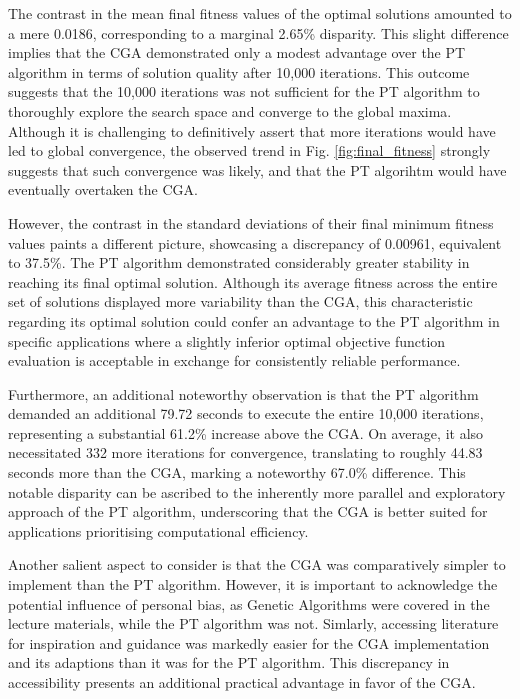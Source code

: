 \documentclass[10pt]{article}
\begin{document}
\begin{multicols}{2}
The contrast in the mean final fitness values of the optimal solutions amounted to a mere 0.0186, corresponding to a marginal 2.65\% disparity. This slight difference implies that the CGA demonstrated only a modest advantage over the PT algorithm in terms of solution quality after 10,000 iterations. This outcome suggests that the 10,000 iterations was not sufficient for the PT algorithm to thoroughly explore the search space and converge to the global maxima. Although it is challenging to definitively assert that more iterations would have led to global convergence, the observed trend in Fig. \ref{fig:final_fitness} strongly suggests that such convergence was likely, and that the PT algorihtm would have eventually overtaken the CGA.

However, the contrast in the standard deviations of their final minimum fitness values paints a different picture, showcasing a discrepancy of 0.00961, equivalent to 37.5\%. The PT algorithm demonstrated considerably greater stability in reaching its final optimal solution. Although its average fitness across the entire set of solutions displayed more variability than the CGA, this characteristic regarding its optimal solution could confer an advantage to the PT algorithm in specific applications where a slightly inferior optimal objective function evaluation is acceptable in exchange for consistently reliable performance.

Furthermore, an additional noteworthy observation is that the PT algorithm demanded an additional 79.72 seconds to execute the entire 10,000 iterations, representing a substantial 61.2\% increase above the CGA. On average, it also necessitated 332 more iterations for convergence, translating to roughly 44.83 seconds more than the CGA, marking a noteworthy 67.0\% difference. This notable disparity can be ascribed to the inherently more parallel and exploratory approach of the PT algorithm, underscoring that the CGA is better suited for applications prioritising computational efficiency.

Another salient aspect to consider is that the CGA was comparatively simpler to implement than the PT algorithm. However, it is important to acknowledge the potential influence of personal bias, as Genetic Algorithms were covered in the lecture materials, while the PT algorithm was not. Simlarly, accessing literature for inspiration and guidance was markedly easier for the CGA implementation and its adaptions than it was for the PT algorithm. This discrepancy in accessibility presents an additional practical advantage in favor of the CGA.


\end{multicols}
\end{document}
